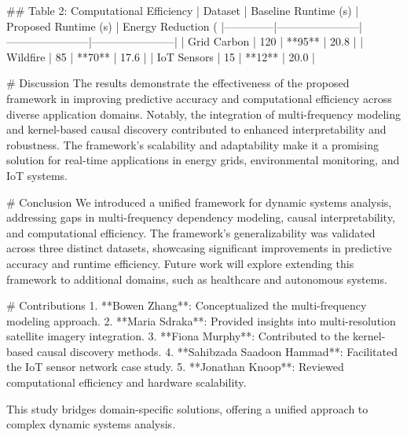 ## Table 2: Computational Efficiency
| Dataset      | Baseline Runtime (s) | Proposed Runtime (s) | Energy Reduction (%
|--------------|-----------------------|-----------------------|-----------------------|
| Grid Carbon  | 120                  | **95**                | 20.8                 |
| Wildfire     | 85                   | **70**                | 17.6                 |
| IoT Sensors  | 15                   | **12**                | 20.0                 |

# Discussion
The results demonstrate the effectiveness of the proposed framework in improving predictive accuracy and computational efficiency across diverse application domains. Notably, the integration of multi-frequency modeling and kernel-based causal discovery contributed to enhanced interpretability and robustness. The framework's scalability and adaptability make it a promising solution for real-time applications in energy grids, environmental monitoring, and IoT systems.

# Conclusion
We introduced a unified framework for dynamic systems analysis, addressing gaps in multi-frequency dependency modeling, causal interpretability, and computational efficiency. The framework's generalizability was validated across three distinct datasets, showcasing significant improvements in predictive accuracy and runtime efficiency. Future work will explore extending this framework to additional domains, such as healthcare and autonomous systems.

# Contributions
1. **Bowen Zhang**: Conceptualized the multi-frequency modeling approach.
2. **Maria Sdraka**: Provided insights into multi-resolution satellite imagery integration.
3. **Fiona Murphy**: Contributed to the kernel-based causal discovery methods.
4. **Sahibzada Saadoon Hammad**: Facilitated the IoT sensor network case study.
5. **Jonathan Knoop**: Reviewed computational efficiency and hardware scalability.

This study bridges domain-specific solutions, offering a unified approach to complex dynamic systems analysis.